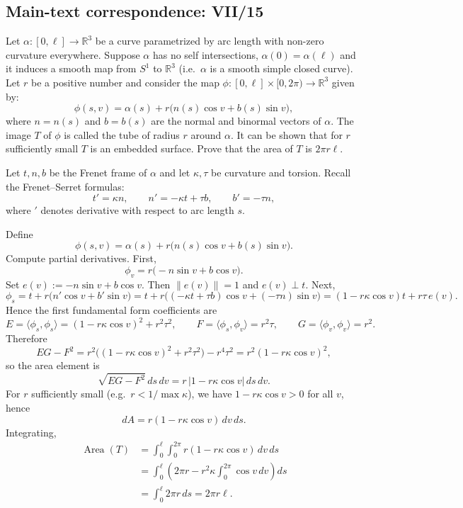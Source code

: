 \subsection*{Main-text correspondence: VII/15}

\begin{problem}
\label{prob:cp-vii-0044}
Let $\alpha:[0,\ell]\to\mathbb R^3$ be a curve parametrized by arc length with non-zero curvature everywhere.
	Suppose $\alpha$ has no self intersections, $\alpha(0)=\alpha(\ell)$ and it induces a smooth map from $S^1$ to $\mathbb R^3$
	(i.e.\ $\alpha$ is a smooth simple closed curve). Let $r$ be a positive number and consider the map
	$\phi:[0,\ell]\times[0,2\pi)\to\mathbb R^3$ given by:
	\[
	\phi(s,v)=\alpha(s)+r\big(n(s)\cos v+b(s)\sin v\big),
	\]
	where $n=n(s)$ and $b=b(s)$ are the normal and binormal vectors of $\alpha$.
	The image $T$ of $\phi$ is called the tube of radius $r$ around $\alpha$.
	It can be shown that for $r$ sufficiently small $T$ is an embedded surface. Prove that the area of $T$ is $2\pi r\ell$.
	
	\medskip
\end{problem}

\begin{solution}
Let $t,n,b$ be the Frenet frame of $\alpha$ and let $\kappa,\tau$ be curvature and torsion.
	Recall the Frenet--Serret formulas:
	\[
	t'=\kappa n,\qquad n'=-\kappa t+\tau b,\qquad b'=-\tau n,
	\]
	where $'$ denotes derivative with respect to arc length $s$.
	
	Define
	\[
	\phi(s,v)=\alpha(s)+r\big(n(s)\cos v+b(s)\sin v\big).
	\]
	Compute partial derivatives. First,
	\[
	\phi_v = r\big(-n\sin v + b\cos v\big).
	\]
	Set $e(v):=-n\sin v + b\cos v$. Then $\|e(v)\|=1$ and $e(v)\perp t$.
	Next,
	\[
	\phi_s
	= t + r\big(n'\cos v + b'\sin v\big)
	= t + r\Big((-\kappa t+\tau b)\cos v + (-\tau n)\sin v\Big)
	= (1-r\kappa\cos v)t + r\tau\,e(v).
	\]
	Hence the first fundamental form coefficients are
	\[
	E=\langle \phi_s,\phi_s\rangle = (1-r\kappa\cos v)^2 + r^2\tau^2,\qquad
	F=\langle \phi_s,\phi_v\rangle = r^2\tau,\qquad
	G=\langle \phi_v,\phi_v\rangle = r^2.
	\]
	Therefore
	\[
	EG-F^2
	= r^2\big((1-r\kappa\cos v)^2 + r^2\tau^2\big)-r^4\tau^2
	= r^2(1-r\kappa\cos v)^2,
	\]
	so the area element is
	\[
	\sqrt{EG-F^2}\,ds\,dv = r\,|1-r\kappa\cos v|\,ds\,dv.
	\]
	For $r$ sufficiently small (e.g.\ $r<1/\max\kappa$), we have $1-r\kappa\cos v>0$ for all $v$, hence
	\[
	dA = r(1-r\kappa\cos v)\,dv\,ds.
	\]
	Integrating,
	\[
\begin{aligned}
\operatorname{Area}(T)
&=\int_0^\ell\int_0^{2\pi} r(1-r\kappa\cos v)\,dv\,ds\\
&=\int_0^\ell
\left(2\pi r-r^2\kappa\int_0^{2\pi}\cos v\,dv\right)ds\\
&=\int_0^\ell 2\pi r\,ds
=2\pi r\ell.
\end{aligned}
\]
	
	
	

\end{solution}

